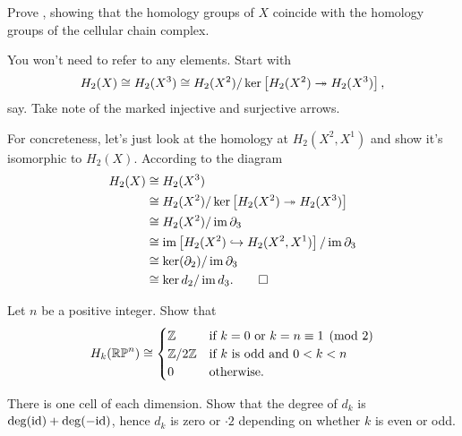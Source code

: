\begin{problem}
	\label{prob:diagram_chase}
	Prove ,
	showing that the homology groups of $X$
	coincide with the homology groups of the cellular chain complex.
	\begin{hint}
		You won't need to refer to any elements.
		Start with \[ H_2(X) \cong H_2(X^3) \cong
			H_2(X^2) / \ker \left[ H_2(X^2) \twoheadrightarrow H_2(X^3) \right], \] say.
		Take note of the marked injective and surjective arrows.
	\end{hint}
	\begin{sol}
		For concreteness, let's just look at the homology at $H_2(X^2, X^1)$
		and show it's isomorphic to $H_2(X)$.
		According to the diagram
		\begin{align*}
			H_2(X) &\cong H_2(X^3) \\
			&\cong H_2(X^2) / \ker \left[ H_2(X^2) \twoheadrightarrow H_2(X^3) \right] \\
			&\cong H_2(X^2) / \operatorname{im} \partial_3 \\
			&\cong \operatorname{im}\left[ H_2(X^2) \hookrightarrow H_2(X^2, X^1) \right] / \operatorname{im} \partial_3 \\
			&\cong \ker(\partial_2) / \operatorname{im}\partial_3 \\
			&\cong \ker d_2 / \operatorname{im} d_3. \qedhere
		\end{align*}
	\end{sol}
\end{problem}

\begin{dproblem}
	\gim
	Let $n$ be a positive integer. Show that
	\[
		H_k(\mathbb{RP}^n)
		\cong
		\begin{cases}
			\mathbb Z & \text{if $k=0$ or $k=n\equiv 1 \pmod 2$} \\
			\mathbb Z/2\mathbb Z & \text{if $k$ is odd and $0 < k < n$} \\
			0 & \text{otherwise}.
		\end{cases}
	\]
	\begin{hint}
		There is one cell of each dimension.
		Show that the degree of $d_k$ is $\deg(\mathrm{id})+\deg(-\mathrm{id})$,
		hence $d_k$ is zero or $\cdot 2$ depending
		on whether $k$ is even or odd.
	\end{hint}
\end{dproblem}

